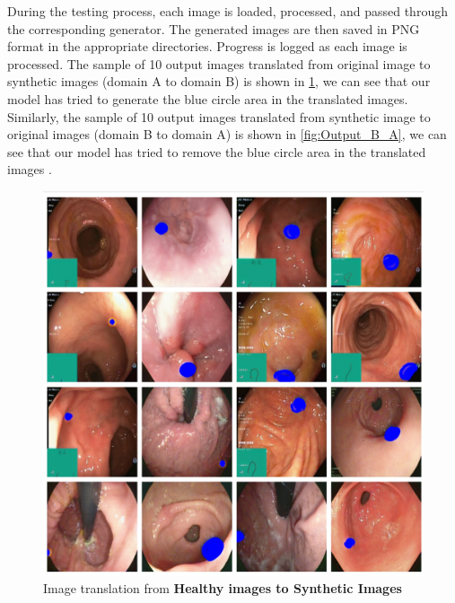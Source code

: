 \documentclass[UKenglish,12pt]{master-style}
\begin{document}
During the testing process, each image is loaded, processed, and passed through the corresponding generator. The generated images are then saved in PNG format in the appropriate directories. Progress is logged as each image is processed. The sample of 10 output images translated from original image to synthetic images (domain A to domain B) is shown in \ref{fig:Output_A_B}, we can see that our model has tried to generate the blue circle area in the translated images. Similarly, the sample of 10 output images translated from synthetic image to original images (domain B to domain A) is shown in \ref{fig:Output_B_A}, we can see that our model has tried to remove the blue circle area in the translated images . 

\begin{figure}[htbp]
    \centering
    \includegraphics[width=1\textwidth]{Images/Output_A_B.jpeg}
    \caption{Image translation from \textbf{Healthy images to Synthetic Images}}
    \label{fig:Output_A_B}
\end{figure}
\end{document}

